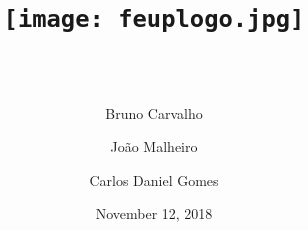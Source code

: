 \documentclass[11pt,a4paper,portrait,titlepage]{article}
\title{
	\texttt{[image: feuplogo.jpg]}\\
	{\Huge \maintitle{}}\\
	{\large \subtitle{}}
}
\date{November 12, 2018}
\author{
	Bruno Carvalho\\\text{up201606517}
	\and
	João Malheiro\\\text{up201605926}
	\and
	Carlos Daniel Gomes\\\text{up201603404}
}
\begin{document}
\begin{titlepage}
\maketitle
\tableofcontents
\thispagestyle{empty}
\end{titlepage}


\clearpage

\printbibliography
\end{document}
